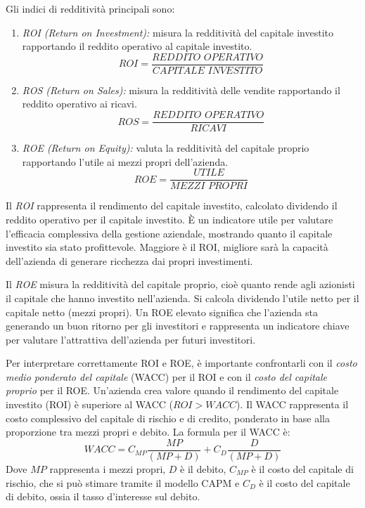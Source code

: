 Gli indici di redditività principali sono:
\begin{enumerate}
    \item \textit{ROI (Return on Investment):} misura la redditività del capitale investito rapportando il reddito operativo al capitale investito.
    \begin{equation*}
        ROI = \frac{\textit{REDDITO OPERATIVO}}{\textit{CAPITALE INVESTITO}}
    \end{equation*}
    \item \textit{ROS (Return on Sales):} misura la redditività delle vendite rapportando il reddito operativo ai ricavi.
    \begin{equation*}
        ROS = \frac{\textit{REDDITO OPERATIVO}}{\textit{RICAVI}}
    \end{equation*}
    \item \textit{ROE (Return on Equity):} valuta la redditività del capitale proprio rapportando l’utile ai mezzi propri dell’azienda.
    \begin{equation*}
        ROE = \frac{\textit{UTILE}}{\textit{MEZZI PROPRI}}
    \end{equation*}
\end{enumerate}
Il \textit{ROI} rappresenta il rendimento del capitale investito, calcolato dividendo il reddito operativo per il capitale investito. È un indicatore utile per valutare l’efficacia complessiva della gestione aziendale, mostrando quanto il capitale investito sia stato profittevole. Maggiore è il ROI, migliore sarà la capacità dell’azienda di generare ricchezza dai propri investimenti.

Il \textit{ROE} misura la redditività del capitale proprio, cioè quanto rende agli azionisti il capitale che hanno investito nell’azienda. Si calcola dividendo l’utile netto per il capitale netto (mezzi propri). Un ROE elevato significa che l’azienda sta generando un buon ritorno per gli investitori e rappresenta un indicatore chiave per valutare l’attrattiva dell’azienda per futuri investitori.

Per interpretare correttamente ROI e ROE, è importante confrontarli con il \textit{costo medio ponderato del capitale} (WACC) per il ROI e con il \textit{costo del capitale proprio} per il ROE. Un’azienda crea valore quando il rendimento del capitale investito (ROI) è superiore al WACC ($ROI > WACC$). Il WACC rappresenta il costo complessivo del capitale di rischio e di credito, ponderato in base alla proporzione tra mezzi propri e debito. La formula per il WACC è:
\begin{equation*}
    W\text{}ACC=C_{MP}\frac{MP}{(MP+D)}+C_{D}\frac{D}{(MP+D)}
\end{equation*}
Dove $MP$ rappresenta i mezzi propri, $D$ è il debito, $C_{MP}$ è il costo del capitale di rischio, che si può stimare tramite il modello CAPM e $C_D$ è il costo del capitale di debito, ossia il tasso d’interesse sul debito.

